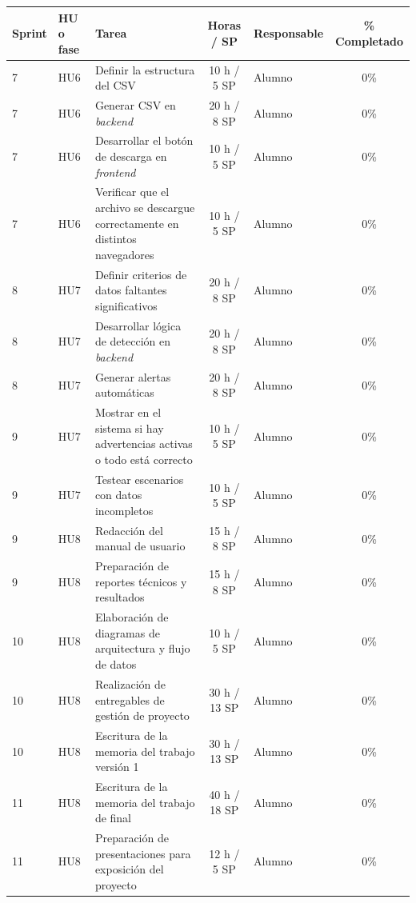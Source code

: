 \documentclass[
11pt, %
]{charter}
\begin{document}
\begin{table}[htpb]
\centering
\begin{tabularx}{\linewidth}{@{}|l|l|X|c|l|c|@{}}
\hline
\rowcolor[HTML]{C0C0C0}
Sprint & HU o fase & Tarea & Horas / SP & Responsable & \% Completado \\ \hline


7 & HU6 & Definir la estructura del CSV & 10 h / 5 SP & Alumno & 0\% \\ \hline
7 & HU6 & Generar CSV en \textit{backend} & 20 h / 8 SP & Alumno & 0\% \\ \hline
7 & HU6 & Desarrollar el botón de descarga en \textit{frontend} & 10 h / 5 SP & Alumno & 0\% \\ \hline
7 & HU6 & Verificar que el archivo se descargue correctamente en distintos navegadores & 10 h / 5 SP & Alumno & 0\% \\ \hline

8 & HU7 & Definir criterios de datos faltantes significativos & 20 h / 8 SP & Alumno & 0\% \\ \hline
8 & HU7 & Desarrollar lógica de detección en \textit{backend} & 20 h / 8 SP & Alumno & 0\% \\ \hline
8 & HU7 & Generar alertas automáticas & 20 h / 8 SP & Alumno & 0\% \\ \hline
9 & HU7 & Mostrar en el sistema si hay advertencias activas o todo está correcto & 10 h / 5 SP & Alumno & 0\% \\ \hline
9 & HU7 & Testear escenarios con datos incompletos & 10 h / 5 SP & Alumno & 0\% \\ \hline

9 & HU8 & Redacción del manual de usuario & 15 h / 8 SP & Alumno & 0\% \\ \hline
9 & HU8 & Preparación de reportes técnicos y resultados & 15 h / 8 SP & Alumno & 0\% \\ \hline
10 & HU8 & Elaboración de diagramas de arquitectura y flujo de datos & 10 h / 5 SP & Alumno & 0\% \\ \hline
10 & HU8 & Realización de entregables de gestión de proyecto & 30 h / 13 SP & Alumno & 0\% \\ \hline
10 & HU8 & Escritura de la memoria del trabajo versión 1 & 30 h / 13 SP & Alumno & 0\% \\ \hline
11 & HU8 & Escritura de la memoria del trabajo de final & 40 h / 18 SP & Alumno & 0\% \\ \hline
11 & HU8 & Preparación de presentaciones para exposición del proyecto & 12 h / 5 SP & Alumno & 0\% \\ \hline

\end{tabularx}
\end{table}
\end{document}
